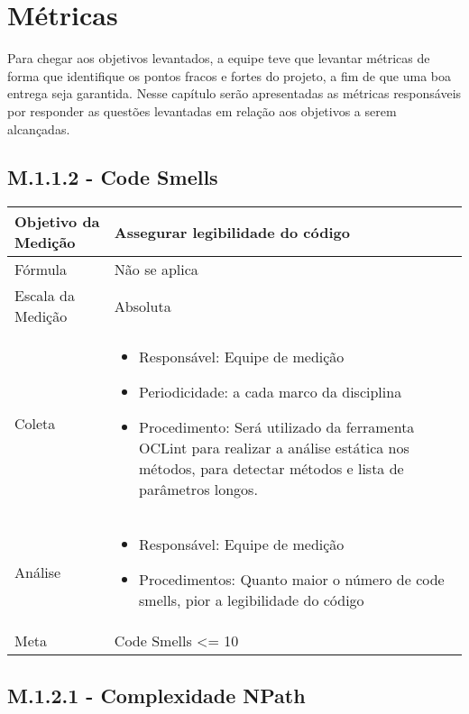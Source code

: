 \chapter{Métricas}
	
	Para chegar aos objetivos levantados, a equipe teve que levantar métricas de forma que identifique os pontos fracos e fortes do projeto, a fim de que uma boa entrega seja garantida.
	Nesse capítulo serão apresentadas as métricas responsáveis por responder as questões levantadas em relação aos objetivos a serem alcançadas.

\section{M.1.1.2 - Code Smells} %

	\begin{tabular}{ |p{4cm}|p{8cm}|  }
	 \hline
	 Objetivo da Medição 		& 	 Assegurar legibilidade do código  \\
	 \hline
	 Fórmula		& 	Não se aplica	\\
	 \hline
	 Escala da Medição 		& 	Absoluta	 \\
	 \hline
	 Coleta		& 	\begin{itemize} \item Responsável: Equipe de medição \item Periodicidade: a cada marco da disciplina \item Procedimento: Será utilizado da ferramenta OCLint para realizar a análise estática nos métodos, para detectar métodos e lista de parâmetros longos. \end{itemize} \\
	 \hline
	 Análise		& 	\begin{itemize} \item Responsável: Equipe de medição \item Procedimentos: Quanto maior o número de code smells, pior a legibilidade do código \end{itemize} 	 \\
	 \hline
	 Meta		& 	Code Smells <= 10	 \\
	 \hline
	\end{tabular}

\section{M.1.2.1 - Complexidade NPath}

